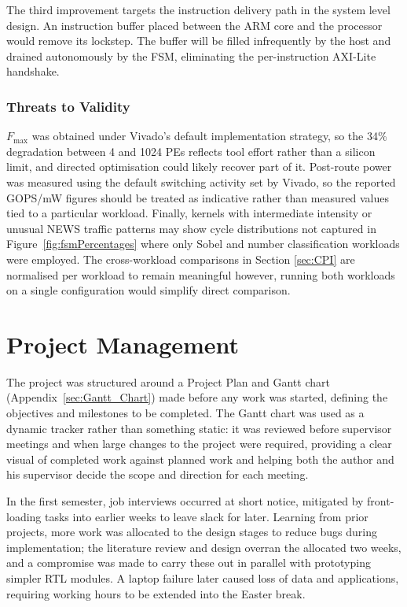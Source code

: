     The third improvement targets the instruction delivery path in the system level design. An instruction buffer placed between the ARM core and the processor would remove its lockstep. The buffer will be filled infrequently by the host and drained autonomously by the FSM, eliminating the per-instruction AXI-Lite handshake.
    
    \subsubsection{Threats to Validity}
    $F_\mathrm{max}$ was obtained under Vivado's default implementation strategy, so the 34\% degradation between 4 and 1024 PEs reflects tool effort rather than a silicon limit, and directed optimisation could likely recover part of it. Post-route power was measured using the default switching activity set by Vivado, so the reported GOPS/mW figures should be treated as indicative rather than measured values tied to a particular workload. Finally, kernels with intermediate intensity or unusual NEWS traffic patterns may show cycle distributions not captured in Figure~\ref{fig:fsmPercentages} where only Sobel and number classification workloads were employed. The cross-workload comparisons in Section \ref{sec:CPI} are normalised per workload to remain meaningful however, running both workloads on a single configuration would simplify direct comparison.


\section{Project Management} \label{sec:ProjectManagement}
    The project was structured around a Project Plan and Gantt chart (Appendix~\ref{sec:Gantt_Chart}) made before any work was started, defining the objectives and milestones to be completed. The Gantt chart was used as a dynamic tracker rather than something static: it was reviewed before supervisor meetings and when large changes to the project were required, providing a clear visual of completed work against planned work and helping both the author and his supervisor decide the scope and direction for each meeting.
    
    In the first semester, job interviews occurred at short notice, mitigated by front-loading tasks into earlier weeks to leave slack for later. Learning from prior projects, more work was allocated to the design stages to reduce bugs during implementation; the literature review and design overran the allocated two weeks, and a compromise was made to carry these out in parallel with prototyping simpler RTL modules. A laptop failure later caused loss of data and applications, requiring working hours to be extended into the Easter break.
    
